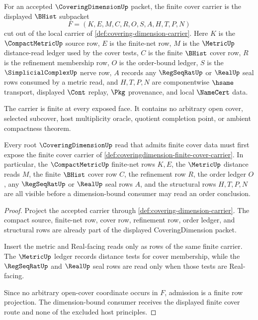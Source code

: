 \begin{definition}
\label{def:coveringdimension-finite-cover-carrier}
For an accepted $\CoveringDimensionUp$ packet, the finite cover carrier is the displayed $\BHist$ subpacket
$$
F=(K,E,M,C,R,O,S,A,H,T,P,N)
$$
cut out of the local carrier of \autoref{def:covering-dimension-carrier}. Here $K$ is the $\CompactMetricUp$ source row, $E$ is the finite-net row, $M$ is the $\MetricUp$ distance-read ledger used by the cover tests, $C$ is the finite $\BHist$ cover row, $R$ is the refinement membership row, $O$ is the order-bound ledger, $S$ is the $\SimplicialComplexUp$ nerve row, $A$ records any $\RegSeqRatUp$ or $\RealUp$ seal rows consumed by a metric read, and $H,T,P,N$ are componentwise $\hsame$ transport, displayed $\Cont$ replay, $\Pkg$ provenance, and local $\NameCert$ data.

The carrier is finite at every exposed face. It contains no arbitrary open cover, selected subcover, host multiplicity oracle, quotient completion point, or ambient compactness theorem.
\end{definition}

\begin{theorem}
\label{thm:coveringdimension-finite-cover-admission}
Every root $\CoveringDimensionUp$ read that admits finite cover data must first expose the finite cover carrier of \autoref{def:coveringdimension-finite-cover-carrier}. In particular, the $\CompactMetricUp$ finite-net rows $K,E$, the $\MetricUp$ distance reads $M$, the finite $\BHist$ cover row $C$, the refinement row $R$, the order ledger $O$, any $\RegSeqRatUp$ or $\RealUp$ seal rows $A$, and the structural rows $H,T,P,N$ are all visible before a dimension-bound consumer may read an order conclusion.
\end{theorem}
\begin{proof}
Project the accepted carrier through \autoref{def:covering-dimension-carrier}. The compact source, finite-net row, cover row, refinement row, order ledger, and structural rows are already part of the displayed CoveringDimension packet.

Insert the metric and Real-facing reads only as rows of the same finite carrier. The $\MetricUp$ ledger records distance tests for cover membership, while the $\RegSeqRatUp$ and $\RealUp$ seal rows are read only when those tests are Real-facing.

Since no arbitrary open-cover coordinate occurs in $F$, admission is a finite row projection. The dimension-bound consumer receives the displayed finite cover route and none of the excluded host principles.
\end{proof}

